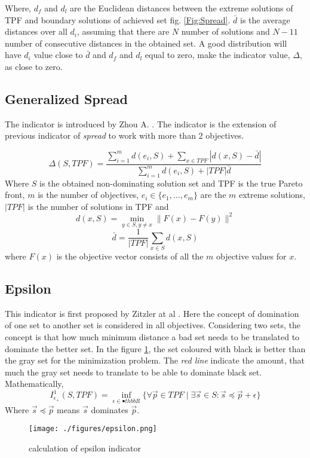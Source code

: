\documentclass{article}
\begin{document}
Where, $d_f$ and $d_l$ are the Euclidean distances between the extreme solutions of TPF and boundary solutions of achieved set fig. \ref{Fig:Spread}.  
$\bar{d}$ is the average distances over all $d_i$, assuming that there are $N$ number of solutions and $N-11$ number of consecutive distances in the obtained set. 
A good distribution will have $d_i$ value close to $\bar{d}$ and $d_f$ and $d_l$ equal to zero, make the indicator value, $\Delta$, as close to zero.

\subsection{Generalized Spread}
The indicator is introduced by Zhou A. \cite{zhou_combining_2006}.
The indicator is the extension of previous indicator of \textit{spread} to work with more than 2 objectives. 

\begin{equation}
\Delta(S,TPF)=\frac{\sum\limits_{i=1}^m d(e_i, S) + \sum\limits_{x \in TPF} |d(x,S)-\bar{d}|}{\sum\limits_{i=1}^m d(e_i, S) + |TPF|\bar{d}}
\end{equation}    
Where $S$ is the obtained non-dominating solution set and TPF is the true Pareto front, $m$ is the number of objectives, $e_i \in \{e_1, \dots, e_m \}$ are the $m$ extreme solutions, $|TPF|$ is the number of solutions in TPF and
\begin{equation}
d(x,S)= \min \limits_{y \in S, y \not= x} \parallel F(x) - F(y) \parallel ^2
\end{equation}
\begin{equation}
\bar{d}=\frac{1}{|TPF|} \sum \limits_{x \in S} d(x,S)
\end{equation}
where $F(x)$ is the objective vector consists of all the $m$ objective values for $x$.

\subsection{Epsilon}
This indicator is first proposed by Zitzler at al \cite{zitzler_performance_2003}. 
Here the concept of domination of one set to another set is considered in all objectives. 
Considering two sets, the concept is that how much minimum distance a bad set needs to be translated to dominate the better set. 
In the figure \ref{fig:epsilon}, the set coloured with black is better than the gray set for the minimization problem. 
The \textit{red line} indicate the amount, that much the gray set needs to translate to be able to dominate black set. Mathematically,
\begin{equation}
I_{\epsilon_+}^1 (S,TPF) = \inf_{\epsilon \in \mathbb{•}thbb{R} } \{\forall \vec{p} \in TPF \mid \exists \vec{s} \in S: 	\vec{s} \preceq \vec{p}+\epsilon\}
\end{equation}  
Where $\vec{s}\preceq\vec{p}$ means $\vec{s}$ dominates $\vec{p}$.
\begin{figure}
\centering

\texttt{[image: ./figures/epsilon.png]}
\caption{calculation of epsilon indicator}
\label{fig:epsilon}
\end{figure}  
  
\end{document}
